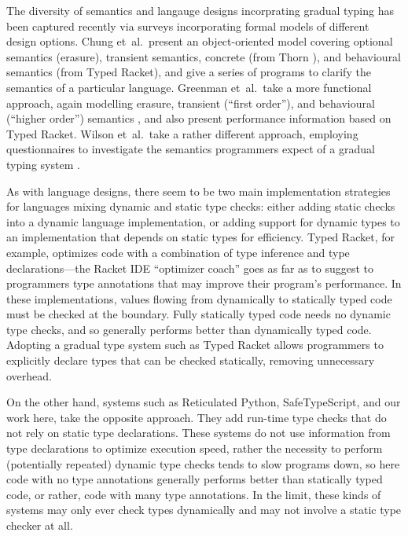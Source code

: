 The diversity of semantics and langauge designs incorprating
gradual typing has been captured recently via surveys
incorporating formal models of different design options.
Chung et~al.\ present an object-oriented model covering optional
semantics (erasure),  transient semantics, concrete (from Thorn
\cite{Bloom2009}), and behavioural semantics (from Typed Racket), and
give a series of programs to clarify the semantics of a
particular language.   
Greenman et~al.\ take a more functional approach, again modelling
erasure, transient (``first order''), and behavioural (``higher
order'') semantics \cite{bensurvey18icfp}, and also present
performance information based on Typed Racket.
Wilson et~al.\ take a rather different approach, employing
questionnaires to investigate the semantics programmers expect of a
gradual typing system  \cite{shriramdls18}.

As with language designs, there seem to be two main implementation
strategies for languages mixing dynamic and static type checks: either
adding static checks into a dynamic language implementation, or adding
support for dynamic types to an implementation that depends on
static types for efficiency. Typed Racket, for example, optimizes code with
a combination of type inference and type declarations---the Racket
IDE ``optimizer coach'' goes as far as to suggest to programmers type
annotations that may improve their program's performance\citep{optimizerCoach2012}. In these implementations, values flowing
from dynamically to statically typed code must be checked at the
boundary.  Fully statically typed code needs no dynamic type checks,
and so generally performs better than dynamically typed code. Adopting
a gradual type system such as Typed Racket\citep{typedScheme08} allows
programmers to explicitly declare types that can be checked statically,
removing unnecessary overhead.

On the other hand, systems such as Reticulated Python\citep{reticPython2014}, SafeTypeScript\citep{Richards2017}, and our
work here, take the opposite approach.
They add run-time type checks that do not rely on static
type declarations. These systems do not use information from type
declarations to optimize execution speed, rather the necessity to
perform (potentially repeated) dynamic type checks tends to slow
programs down, so here code with no type annotations generally
performs better than statically typed code, or rather, code with many
type annotations. In the limit, these kinds of systems may only ever
check types dynamically and may not involve a static type checker at
all. 

